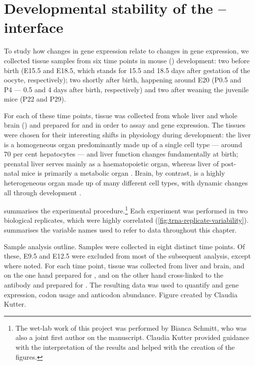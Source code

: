 \chapter{Developmental stability of the -- interface}
\label{sec:trna}

To study how changes in \mrna gene expression relate to changes in \trna gene
expression, we collected tissue samples from six time points in mouse (\mmu)
development: two before birth (E15.5 and E18.5, which stands for \num{15.5} and
\num{18.5} days after gestation of the oocyte, respectively); two shortly after
birth, happening around E20 (P0.5 and P4 --- \num{0.5} and \num{4} days after
birth, respectively) and two after weaning the juvenile mice (P22 and P29).

For each of these time points, tissue was collected from whole liver and whole
brain () and prepared for \rnaseq and  \chipseq in order to
assay \mrna and \trna gene expression. The tissues were chosen for their
interesting shifts in physiology during development: the liver is a homogeneous
organ predominantly made up of a single cell type --- around \num{70} per cent
hepatocytes --- and liver function changes fundamentally at birth; prenatal
liver serves mainly as a haematopoietic organ, whereas liver of post-natal mice
is primarily a metabolic organ \citep{Si-Tayeb:2010}. Brain, by contrast, is a
highly heterogeneous organ made up of many different cell types, with dynamic
changes all through development \citep{Liscovitch:2013}.

 summarises the experimental
procedure.\footnote{The wet-lab work of this project was performed by Bianca
Schmitt, who was also a joint first author on the manuscript. Claudia Kutter
provided guidance with the interpretation of the results and helped with the
creation of the figures.} Each experiment was performed in two biological
replicates, which were highly correlated
(\cref{fig:trna-replicate-variability}).  summarises the
variable names used to refer to data throughout this chapter.

    {Sample analysis outline.}
    {Samples were collected in eight distinct time points. Of these, E9.5 and
    E12.5 were excluded from most of the subsequent analysis, except where
    noted. For each time point, tissue was collected from liver and brain, and
    on the one hand prepared for \rnaseq, and on the other hand cross-linked to
    the  antibody and prepared for \chipseq. The resulting data was used to
    quantify \mrna and \trna gene expression, codon usage and \trna anticodon
    abundance. Figure created by Claudia Kutter.}

